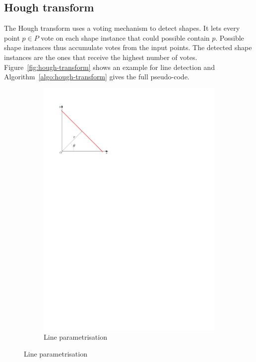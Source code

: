 \subsection{Hough transform}
The Hough transform uses a voting mechanism to detect shapes.
It lets every point $p \in P$ vote on each shape instance that could possible contain $p$.
Possible shape instances thus accumulate votes from the input points.
The detected shape instances are the ones that receive the highest number of votes.
Figure~\ref{fig:hough-transform} shows an example for line detection and Algorithm~\ref{algo:hough-transform} gives the full pseudo-code.
\begin{figure}[htb]
	\centering
	\begin{subfigure}[b]{0.3\linewidth}
		\centering
		\includegraphics[width=\textwidth,page=1]{figs/hough-transform.pdf}
		\caption{Line parametrisation}
		\label{fig:hough-transform:a}

\end{subfigure}
\end{figure}
